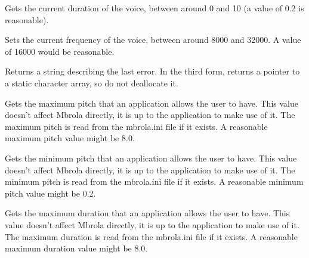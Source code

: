 \label{wxmbrolagetduration}


Gets the current duration of the voice, between around 0 and 10 (a value of 0.2 is reasonable).

\label{wxmbrolagetfreq}


Sets the current frequency of the voice, between around 8000 and 32000. A value of 16000 would be reasonable.

\label{wxmbrolagetlasterror}




Returns a string describing the last error. In the third form, returns a pointer to
a static character array, so do not deallocate it.

\label{wxmbrolagetmaxpitch}


Gets the maximum pitch that an application allows the user to have. This value doesn't
affect Mbrola directly, it is up to the application to make use of it. The maximum
pitch is read from the mbrola.ini file if it exists. A reasonable maximum pitch value might be 8.0.

\label{wxmbrolagetminpitch}


Gets the minimum pitch that an application allows the user to have. This value doesn't
affect Mbrola directly, it is up to the application to make use of it. The minimum
pitch is read from the mbrola.ini file if it exists. A reasonable minimum pitch value might be 0.2.

\label{wxmbrolagetmaxduration}


Gets the maximum duration that an application allows the user to have. This value doesn't
affect Mbrola directly, it is up to the application to make use of it. The maximum
duration is read from the mbrola.ini file if it exists. A reasonable maximum duration value might be 8.0.

